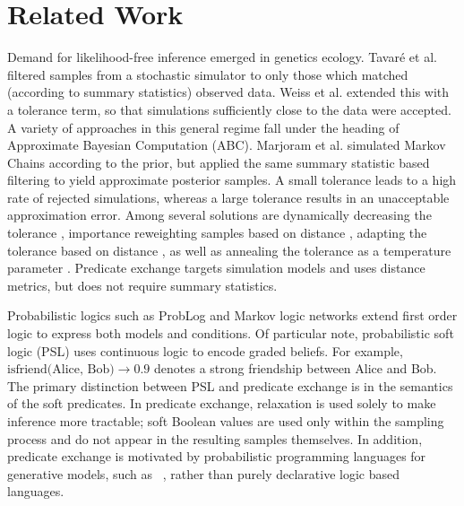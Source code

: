 \section{Related Work}

Demand for likelihood-free inference emerged in genetics ecology.
Tavar{\'e} et al.  
filtered samples from a stochastic simulator to only those which matched (according to summary statistics) observed data. 
Weiss et al.  extended this with a tolerance term, so that simulations sufficiently close to the data were accepted.
A variety of approaches in this general regime  \cite{beaumont2002approximate,sisson2007sequential} fall under the heading of Approximate Bayesian Computation (ABC).
Marjoram et al.  simulated Markov Chains according to the prior, but applied the same summary statistic based filtering to yield approximate posterior samples.
A small tolerance leads to a high rate of rejected simulations, whereas a large tolerance results in an unacceptable approximation error.
Among several solutions are dynamically decreasing the tolerance \cite{toni2008approximate}, importance reweighting samples based on distance \cite{wegmann2009efficient}, adapting the tolerance based on distance \cite{del2012adaptive,lenormand2013adaptive}, as well as annealing the tolerance as a temperature parameter \cite{albert2015simulated}.
Predicate exchange targets simulation models and uses distance metrics, but does not require summary statistics.


Probabilistic logics such as ProbLog \cite{richardson2006markov} and Markov logic networks \cite{de2007problog} extend first order logic to express both models and conditions.
Of particular note, probabilistic soft logic (PSL) \cite{brocheler2012probabilistic,kimmig2012short} uses continuous logic to encode graded beliefs.
For example, $\text{isfriend(Alice, Bob)} \to 0.9$ denotes a strong friendship between Alice and Bob.
The primary distinction between PSL and predicate exchange is in the semantics of the soft predicates.
In predicate exchange, relaxation is used solely to make inference more tractable; soft Boolean values are used only within the sampling process and do not appear in the resulting samples themselves.
In addition, predicate exchange is motivated by probabilistic programming languages for generative models, such as ~\citep{milch20071, wood2014new,mansinghka2014venture,goodman2008church}, rather than purely declarative logic based languages.


